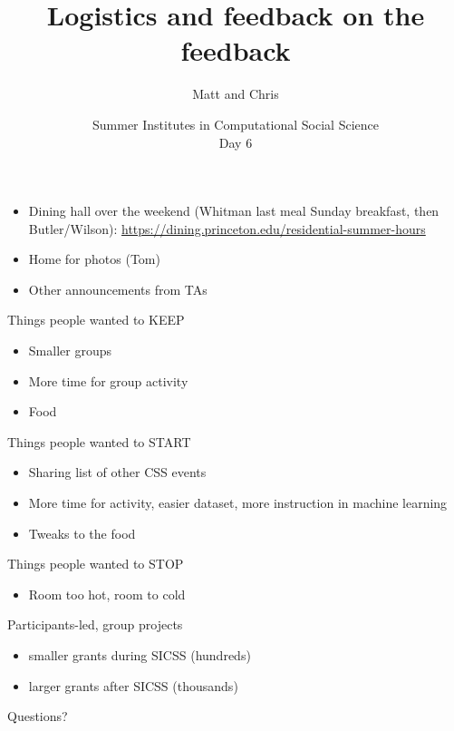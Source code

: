 \documentclass{beamer}
\title[]{Logistics and feedback on the feedback}
\author[]{Matt and Chris}
\date[]{Summer Institutes in Computational Social Science\\Day 6
}
\begin{document}
\frame{\titlepage}
\begin{frame}

\begin{itemize}
\item Dining hall over the weekend (Whitman last meal Sunday breakfast, then Butler/Wilson):  \url{https://dining.princeton.edu/residential-summer-hours}
\pause
\item Home for photos (Tom)
\pause
\item Other announcements from TAs
\end{itemize}

\end{frame}
\begin{frame}

Things people wanted to KEEP
\begin{itemize}
\item Smaller groups 
\item More time for group activity
\item Food
\end{itemize}

\end{frame}
\begin{frame}

Things people wanted to START
\begin{itemize}
\item Sharing list of other CSS events
\pause
\item More time for activity, easier dataset, more instruction in machine learning
\pause
\item Tweaks to the food
\end{itemize}

\end{frame}
\begin{frame}

Things people wanted to STOP
\begin{itemize}
\item Room too hot, room to cold
\end{itemize}

\end{frame}
\begin{frame}

Participants-led, group projects
\pause
\begin{itemize}
\item smaller grants during SICSS (hundreds)
\item larger grants after SICSS (thousands)
\end{itemize}

\end{frame}
\begin{frame}

\begin{center}
\LARGE
Questions?
\end{center}

\end{frame}
\end{document}
